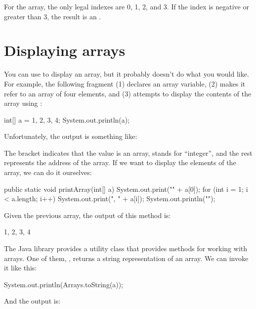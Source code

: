 For the  array, the only legal indexes are 0, 1, 2, and 3.
If the index is negative or greater than 3, the result is an .


\section{Displaying arrays}
\label{printarray}

You can use  to display an array, but it probably doesn't do what you would like.
For example, the following fragment (1) declares an array variable, (2) makes it refer to an array of four elements, and (3) attempts to display the contents of the array using :

\begin{code}
int[] a = {1, 2, 3, 4};
System.out.println(a);
\end{code}

Unfortunately, the output is something like:

\begin{stdout}
[I@bf3f7e0
\end{stdout}

The bracket indicates that the value is an array,  stands for ``integer'', and the rest represents the address of the array.
If we want to display the elements of the array, we can do it ourselves:

\begin{code}
public static void printArray(int[] a) {
    System.out.print("{" + a[0]);
    for (int i = 1; i < a.length; i++) {
        System.out.print(", " + a[i]);
    }
    System.out.println("}");
}
\end{code}

Given the previous array, the output of this method is:

\begin{stdout}
{1, 2, 3, 4}
\end{stdout}


The Java library provides a utility class  that provides methods for working with arrays.
One of them, , returns a string representation of an array.
We can invoke it like this:

\begin{code}
System.out.println(Arrays.toString(a));
\end{code}

And the output is:

